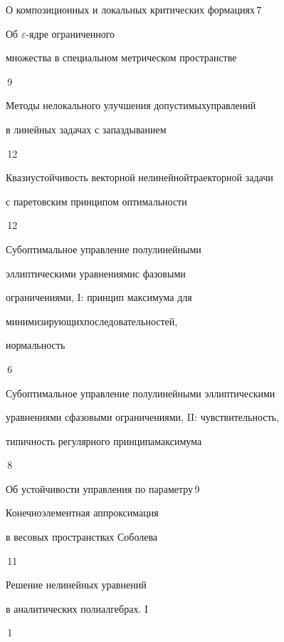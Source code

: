 {О композиционных и локальных критических формациях}{\No\,7}




{Об $\varepsilon$-ядре ограниченного


множества в специальном метрическом пространстве}{\No\,9}




{Методы нелокального улучшения допустимых\newline управлений


в линейных задачах с запаздыванием}{\No\,12}




{Квазиустойчивость векторной нелинейной\newline траекторной задачи


с паретовским принципом оптимальности}{\No\,12}




{Субоптимальное управление полулинейными  


эллиптическими уравнениями\newline с фазовыми  


ограничениями, I: принцип максимума для 


минимизирующих\newline последовательностей, 


нормальность}{\No\,6}




{Субоптимальное управление полулинейными эллиптическими


уравнениями с\newline фазовыми ограничениями, II: чувствительность,


типичность регулярного принципа\newline максимума}{\No\,8}




{Об устойчивости управления по параметру}{\No\,9}




{Конечноэлементная аппроксимация 


в весовых пространствах Соболева}{\No\,11}




{Решение нелинейных уравнений 


в аналитических полиалгебрах. I}{\No\,1}




